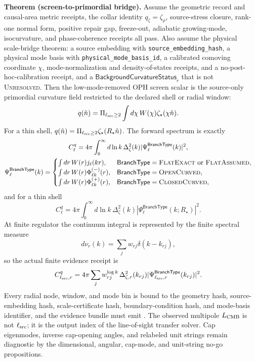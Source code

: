 \textbf{Theorem (screen-to-primordial bridge).}\label{thm:oph-screen-to-primordial}
Assume the geometric record and causal-area metric receipts, the collar
identity \(q_\zeta=\zeta_\rho\), source-stress closure, rank-one normal form,
positive repair gap, freeze-out, adiabatic growing-mode, isocurvature, and
phase-coherence receipts all pass.  Also assume the physical scale-bridge theorem: a source embedding with
\texttt{source\_embedding\_hash}, a physical mode basis with
\texttt{physical\_mode\_basis\_id}, a calibrated comoving coordinate \(\chi\),
mode-normalization and density-of-states receipts, and a no-post-hoc-calibration
receipt, and a \(\mathsf{BackgroundCurvatureStatus}_r\) that is not \textsc{Unresolved}.  Then the low-mode-removed OPH screen
scalar is the source-only primordial curvature field restricted to the
declared shell or radial window:
\[
q(\hat n)=
\Pi_{\ell_{\rm src}\ge2}\int d\chi\,W(\chi)\zeta_\star(\chi\hat n).
\]
For a thin shell, \(q(\hat n)=\Pi_{\ell_{\rm src}\ge2}\zeta_\star(R_\star\hat n)\).  The
forward spectrum is exactly
\[
\begin{gathered}
C_\ell^q
=
4\pi\int_0^\infty d\ln k\,
\Delta_\zeta^2(k)|\Psi_\ell^{\mathsf{BranchType}}(k)|^2,\\
\Psi_\ell^{\mathsf{BranchType}}(k)=
\begin{cases}
\int dr\,W(r)j_\ell(kr), & \mathsf{BranchType}=\textsc{FlatExact}\ \hbox{or}\ \textsc{FlatAssumed},\\
\int dr\,W(r)\Phi^{(-)}_{\ell k}(r), & \mathsf{BranchType}=\textsc{OpenCurved},\\
\int dr\,W(r)\Phi^{(+)}_{\ell k}(r), & \mathsf{BranchType}=\textsc{ClosedCurved},
\end{cases}
\end{gathered}
\]
and for a thin shell
\[
C_\ell^q
=
4\pi\int_0^\infty d\ln k\,
\Delta_\zeta^2(k)
\left|\Psi_\ell^{\mathsf{BranchType}}(k;R_\star)\right|^2 .
\]
At finite regulator the continuum integral is represented by the finite
spectral measure
\[
d\nu_r(k)=\sum_j w_{rj}\delta(k-k_{rj}),
\]
so the actual finite evidence receipt is
\[
C_{\ell_{\rm src},r}^q
=4\pi\sum_j w^{\log k}_{rj}\,
\Delta_{\zeta,r}^2(k_{rj})
|\Psi^{\mathsf{BranchType}}_{\ell_{\rm src},r}(k_{rj})|^2.
\]
Every radial node, window, and mode bin is bound to the geometry hash,
source-embedding hash, scale-certificate hash, boundary-condition hash, and
mode-basis identifier, and the evidence bundle must emit
.  The observed multipole \(L_{\rm CMB}\) is not
\(\ell_{\rm src}\); it is the output index of the line-of-sight transfer solver.
Cap eigenmodes, inverse cap-opening angles, and relabeled unit strings remain
diagnostic by the dimensional, angular, cap-mode, and unit-string no-go propositions.

